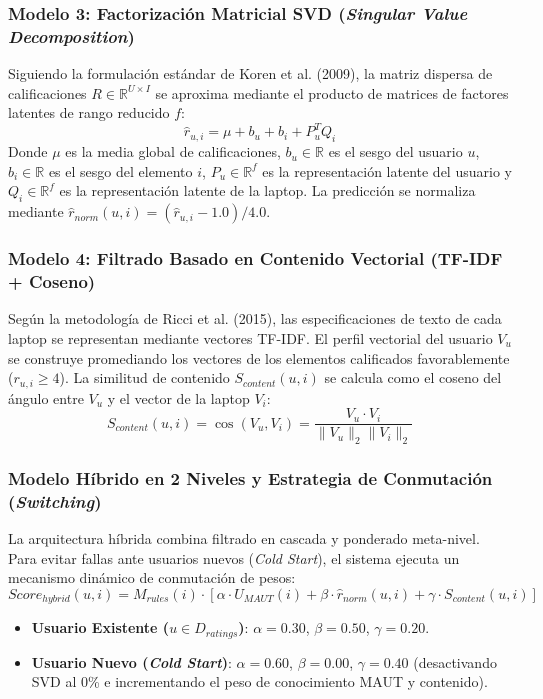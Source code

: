 \documentclass[12pt,a4paper]{article}
\begin{document}
\subsubsection{Modelo 3: Factorización Matricial SVD (\textit{Singular Value Decomposition})}
Siguiendo la formulación estándar de Koren et al. (2009), la matriz dispersa de calificaciones $R \in \mathbb{R}^{U \times I}$ se aproxima mediante el producto de matrices de factores latentes de rango reducido $f$:
\begin{equation}
\hat{r}_{u,i} = \mu + b_u + b_i + P_u^T Q_i
\end{equation}
Donde $\mu$ es la media global de calificaciones, $b_u \in \mathbb{R}$ es el sesgo del usuario $u$, $b_i \in \mathbb{R}$ es el sesgo del elemento $i$, $P_u \in \mathbb{R}^f$ es la representación latente del usuario y $Q_i \in \mathbb{R}^f$ es la representación latente de la laptop. La predicción se normaliza mediante $\hat{r}_{norm}(u,i) = (\hat{r}_{u,i} - 1.0) / 4.0$.

\subsubsection{Modelo 4: Filtrado Basado en Contenido Vectorial (TF-IDF + Coseno)}
Según la metodología de Ricci et al. (2015), las especificaciones de texto de cada laptop se representan mediante vectores TF-IDF. El perfil vectorial del usuario $V_u$ se construye promediando los vectores de los elementos calificados favorablemente ($r_{u,i} \ge 4$). La similitud de contenido $S_{content}(u,i)$ se calcula como el coseno del ángulo entre $V_u$ y el vector de la laptop $V_i$:
\begin{equation}
S_{content}(u,i) = \cos(V_u, V_i) = \frac{V_u \cdot V_i}{\|V_u\|_2 \|V_i\|_2}
\end{equation}

\subsubsection{Modelo Híbrido en 2 Niveles y Estrategia de Conmutación (\textit{Switching})}
La arquitectura híbrida combina filtrado en cascada y ponderado meta-nivel. Para evitar fallas ante usuarios nuevos (\textit{Cold Start}), el sistema ejecuta un mecanismo dinámico de conmutación de pesos:
\begin{equation}
Score_{hybrid}(u,i) = M_{rules}(i) \cdot \left[ \alpha \cdot U_{MAUT}(i) + \beta \cdot \hat{r}_{norm}(u,i) + \gamma \cdot S_{content}(u,i) \right]
\end{equation}
\begin{itemize}
    \item \textbf{Usuario Existente ($u \in D_{ratings}$)}: $\alpha = 0.30$, $\beta = 0.50$, $\gamma = 0.20$.
    \item \textbf{Usuario Nuevo (\textit{Cold Start})}: $\alpha = 0.60$, $\beta = 0.00$, $\gamma = 0.40$ (desactivando SVD al 0\% e incrementando el peso de conocimiento MAUT y contenido).
\end{itemize}
\end{document}
